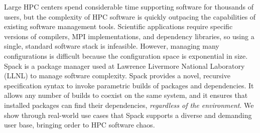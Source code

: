 
Large HPC centers spend considerable time supporting software for thousands of users, but the complexity of HPC software is quickly outpacing the capabilities of existing software management tools. Scientific applications require specific versions of compilers, MPI implementations, and dependency libraries, so using a single, standard software stack is infeasible.  However, managing many configurations is difficult because the configuration space is exponential in size.
%
Spack is a package manager used at Lawrence Livermore National Laboratory (LLNL) to manage software complexity. Spack provides a novel, recursive specification syntax to invoke parametric builds of packages and dependencies.  It allows any number of builds to coexist on the same system, and it ensures that installed packages can find their dependencies, {\it regardless of the environment}. We show through real-world use cases that Spack supports a diverse and demanding user base, bringing order to HPC software chaos.
